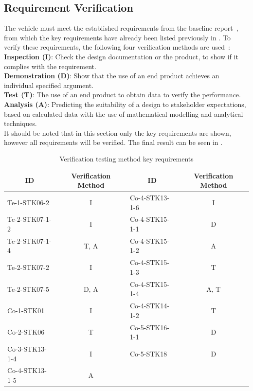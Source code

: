\subsection{Requirement Verification}
The vehicle must meet the established requirements from the baseline report~\cite{baselinerepo}, from which the key requirements have already been listed previously in .
To verify these requirements, the following four verification methods are used~\cite{nasa_product_verification}:\\
\textbf{Inspection (I)}: Check the design documentation or the product, to show if it complies with the requirement.\\
\textbf{Demonstration (D)}: Show that the use of an end product achieves an individual specified argument.\\
\textbf{Test (T)}: The use of an end product to obtain data to verify the performance.\\
\textbf{Analysis (A)}: Predicting the suitability of a design to stakeholder expectations, based on calculated data with the use of mathematical modelling and analytical techniques.\\
It should be noted that in this section only the key requirements are shown, however all requirements will be verified.
The final result can be seen in .


\begin{table}[H]
\centering
\caption{Verification testing method key requirements}
\label{tab:reqverification}
\begin{tabular}{lc|lc}
\toprule
\multicolumn{1}{c}{\textbf{ID}} & \textbf{Verification Method} & \multicolumn{1}{c}{\textbf{ID}} & \textbf{Verification Method} \\
\midrule
Te-1-STK06-2 & I & Co-4-STK13-1-6 & I \\
Te-2-STK07-1-2 & I & Co-4-STK15-1-1 & D \\
Te-2-STK07-1-4 & T, A & Co-4-STK15-1-2 & A \\
Te-2-STK07-2 & I & Co-4-STK15-1-3 & T \\
Te-2-STK07-5 & D, A & Co-4-STK15-1-4 & A, T \\
Co-1-STK01 & I & Co-4-STK14-1-2 & T \\
Co-2-STK06 & T & Co-5-STK16-1-1 & D \\
Co-3-STK13-1-4 & I & Co-5-STK18 & D \\
Co-4-STK13-1-5 & A & & \\
\bottomrule
\end{tabular}
\end{table}



